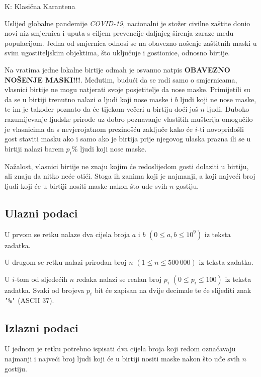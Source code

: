 \begin{statement}[
  timelimit=1 s,
  memorylimit=512 MiB,
]{K: Klasična Karantena}

Uslijed globalne pandemije \textit{COVID-19}, nacionalni je stožer civilne
zaštite donio novi niz smjernica i uputa s ciljem prevencije daljnjeg širenja
zaraze među populacijom. Jedna od smjernica odnosi se na obavezno nošenje
zaštitnih maski u svim ugostiteljskim objektima, što uključuje i gostionice,
odnosno birtije.

Na vratima jedne lokalne birtije odmah je osvanuo natpis \textbf{OBAVEZNO
NOŠENJE MASKI!!!}. Međutim, budući da se radi samo o smjernicama, vlasnici
birtije ne mogu natjerati svoje posjetitelje da nose maske. Primijetili su da
se u birtiji trenutno nalazi $a$ ljudi koji nose maske i $b$ ljudi koji ne
nose maske, te im je također poznato da će tijekom večeri u birtiju doći još
$n$ ljudi. Duboko razumijevanje ljudske prirode uz dobro poznavanje vlastitih
mušterija omogučilo je vlasnicima da s nevjerojatnom prezinošću zaključe kako
će $i$-ti novopridošli gost staviti masku ako i samo ako je birtija prije
njegovog ulaska prazna ili se u birtiji nalazi barem $p_i\%$ ljudi koji nose
maske.

Nažalost, vlasnici birtije ne znaju kojim će redoslijedom gosti dolaziti u
birtiju, ali znaju da nitko neće otići. Stoga ih zanima koji je najmanji,
a koji najveći broj ljudi koji će u birtiji nositi maske nakon što uđe svih
$n$ gostiju.

\subsection*{Ulazni podaci}
U prvom se retku nalaze dva cijela broja $a$ i $b$ $(0 \le a, b \le 10^9)$ iz
teksta zadatka.

U drugom se retku nalazi prirodan broj $n$ $(1 \le n \le 500\,000)$ iz teksta
zadatka.

U $i$-tom od sljedećih $n$ redaka nalazi se realan broj $p_i$ $(0 \le p_i \le
100)$ iz teksta zadatka. Svaki od brojeva $p_i$ bit će zapisan na dvije
decimale te će slijediti znak \texttt{'\%'} (ASCII $37$).

\subsection*{Izlazni podaci}
U jednom je retku potrebno ispisati dva cijela broja koji redom označavaju
najmanji i najveći broj ljudi koji će u birtiji nositi maske nakon što uđe
svih $n$ gostiju.


\end{statement}
